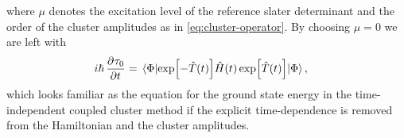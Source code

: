             where $\mu$ denotes the excitation level of the reference slater
            determinant and the order of the cluster amplitudes as in
            \autoref{eq:cluster-operator}.
            By choosing $\mu = 0$ we are left with
            \begin{align}
                i\hslash \dpd{\clustamp_{0}}{t}
                &=
                \mel{\slat}{
                    \exp[-\clust(t)]
                    \hamil(t)
                    \exp[\clust(t)]
                }{\slat},
            \end{align}
            which looks familiar as the equation for the ground state
            energy in the time-independent coupled cluster method if the
            explicit time-dependence is removed from the Hamiltonian and the
            cluster amplitudes.
